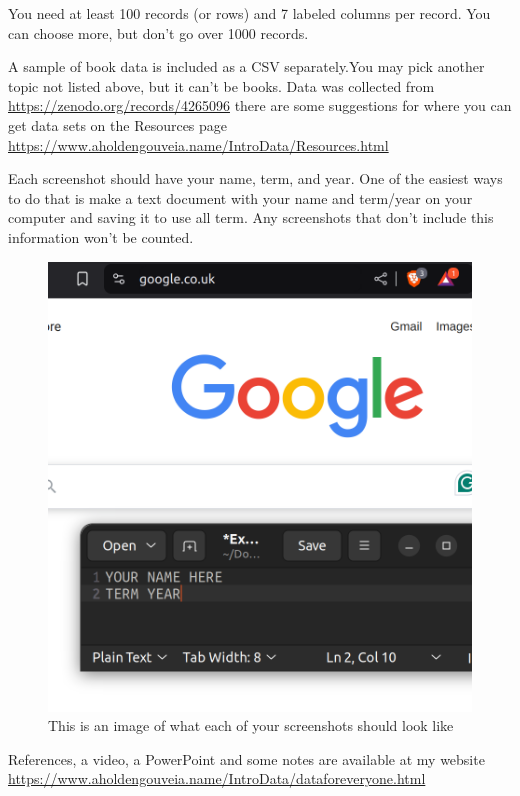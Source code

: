 \documentclass[12pt]{article}
\begin{document}
You need at least 100 records (or rows) and 7 labeled columns per record. You can choose more, but don't go over 1000 records.

A sample of book data is included as a CSV separately.You may pick another topic not listed above, but it can't be books. Data was collected from \url {https://zenodo.org/records/4265096} there are some suggestions for where you can get data sets on the Resources page \url{https://www.aholdengouveia.name/IntroData/Resources.html}

Each screenshot should have your name, term, and year.  One of the easiest ways to do that is make a text document with your name and term/year on your computer and saving it to use all term. Any screenshots that don't include this information won't be counted.

\begin{figure}[h!]
    \centerline{\includegraphics[scale=.2]{ExampleScreenshot.png}}
    \caption{This is an image of what each of your screenshots should look like}

    \end{figure} 


References, a video, a PowerPoint and some notes are available at my website \url {https://www.aholdengouveia.name/IntroData/dataforeveryone.html}
\end{document}
